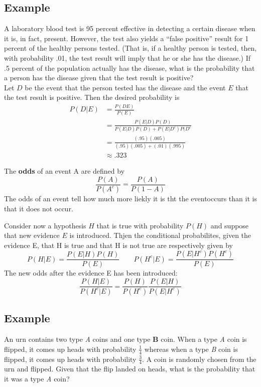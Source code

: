 \subsection*{Example}
A laboratory blood test is 95 percent effective in detecting a certain disease when
it is, in fact, present. However, the test also yields a “false positive” result for 1
percent of the healthy persons tested. (That is, if a healthy person is tested, then,
with probability .01, the test result will imply that he or she has the disease.) If .5
percent of the population actually has the disease, what is the probability that a
person has the disease given that the test result is positive?
\\
Let $D$ be the event that the person tested has the disease and the event $E$ that
the test result is positive. Then the desired probability is
\begin{equation*}
    \begin{split}
        P(D|E) & = \frac{P(DE)}{P(E)}\\
        & = \frac{P(E|D)P(D)}{P(E|D)P(D) + P(E|D^c)P(D^c}\\
        & = \frac{(.95)(.005)}{(.95)(.005) + (.01)(.995)}\\
        & \approx .323
    \end{split}
\end{equation*}
\begin{definition}[Odds]
    The \textbf{odds} of an event A are defined by \[\frac{P(A)}{P(A^c)} = \frac{P(A)}{P(1-A)}\]
    The odds of an event tell how much more liekly it is tht the eventoccurs than it is that it does not occur. 
\end{definition}
Consider now a hypothesis $H$ that is true with probability $P(H)$ and suppose that new evidence $E$ is introduced. Thjen the conditional probabilites, given the evidence E, that H is true and that H is not true are respectively given by 
\[P(H|E) = \frac{P(E|H)P(H)}{P(E)}\qquad P(H^c|E) = \frac{P(E|H^c)P(H^c)}{P(E)}\]
The new odds after the evidence E has been introduced:
\begin{equation}
    \frac{P(H|E)}{P(H^c|E)} = \frac{P(H)}{P(H^c)}\frac{P(E|H)}{P(E|H^c)}
\end{equation}
\subsection*{Example}
An urn contains two type \textit{A} coins and one type \textbf{B} coin. When a type \textit{A} coin is
flipped, it comes up heads with probability $\frac{1}{4}$ whereas when a type \textit{B} coin is
flipped, it comes up heads with probability $\frac{3}{4}$. A coin is randomly chosen from
the urn and flipped. Given that the flip landed on heads, what is the probability
that it was a type \textit{A} coin?
